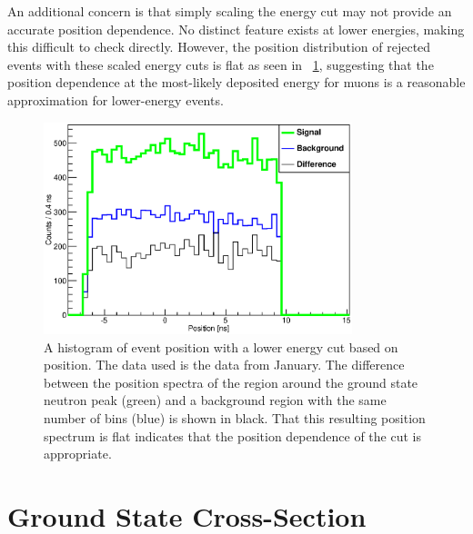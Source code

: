 An additional concern is that simply scaling the energy cut may not provide an accurate position dependence.  No distinct feature exists at lower energies, making this difficult to check directly.  However, the position distribution of rejected events with these scaled energy cuts is flat as seen in {\fig}~\ref{fig:flatPositionSpectrum}, suggesting that the position dependence at the most-likely deposited energy for muons is a reasonable approximation for lower-energy events.
\begin{figure}[!htbp]
\centering
\includegraphics[width=0.8\textwidth]{figures/PositionSpectrum2.eps}
\caption{A histogram of event position with a lower energy cut based on position.  The data used is the \MgReaction data from January.  The difference between the position spectra of the region around the ground state neutron peak (green) and a background region with the same number of bins (blue) is shown in black.  That this resulting position spectrum is flat indicates that the position dependence of the cut is appropriate.}
\label{fig:flatPositionSpectrum}
\end{figure}

\section{Ground State Cross-Section}

